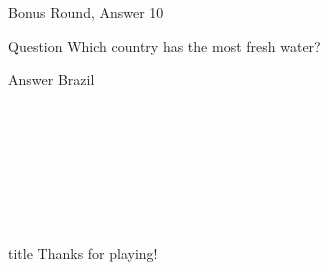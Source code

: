 \documentclass[11pt]{beamer}
\begin{document}
\begin{frame}[t]{Bonus Round, Answer 10}
\vspace{2em}
\begin{block}{Question}
Which country has the most fresh water\@?
\end{block}
\pause{}
\begin{block}{Answer}
Brazil
\end{block}
\end{frame}
    

\section*{\ }
\subsection*{\ }
\begingroup{}
\begin{frame}
\vfill{}
\centering{}
\begin{beamercolorbox}[sep=8pt,center,shadow=true,rounded=true]{title}
Thanks for playing!\par%
\end{beamercolorbox}
\vfill{}
\end{frame}
\endgroup{}
\end{document}
